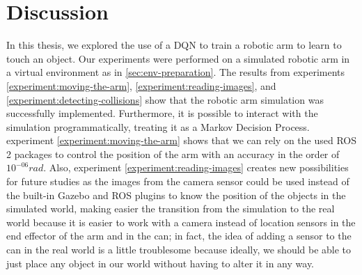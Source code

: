 \documentclass[12pt,oneside]{article}
\begin{document}
\section{Discussion}
In this thesis, we explored the use of a DQN to train a robotic arm to learn to touch an object. Our experiments were performed on a simulated robotic arm in a virtual environment as in \ref{sec:env-preparation}.
The results from experiments \ref{experiment:moving-the-arm}, \ref{experiment:reading-images}, and \ref{experiment:detecting-collisions} show that the robotic arm simulation was successfully implemented. Furthermore, it is possible to interact with the simulation programmatically, treating it as a Markov Decision Process. experiment \ref{experiment:moving-the-arm} shows that we can rely on the used ROS 2 packages to control the position of the arm with an accuracy in the order of $10^{-06} rad$.
Also, experiment \ref{experiment:reading-images} creates new possibilities for future studies as the images from the camera sensor could be used instead of the built-in Gazebo and ROS plugins to know the position of the objects in the simulated world, making easier the transition from the simulation to the real world because it is easier to work with a camera instead of location sensors in the end effector of the arm and in the can; in fact, the idea of adding a sensor to the can in the real world is a little troublesome because ideally, we should be able to just place any object in our world without having to alter it in any way. 
\end{document}
